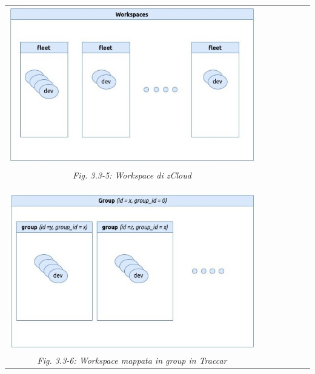 \documentclass[a4paper,titlepage,12pt]{book}
\begin{document}
{\begin{center}
\begin{tabular}{c c c cc c c}
\includegraphics[scale=0.6]{images/wks.jpg}\\ 
\textit{Fig. 3.3-5: Workspace di zCloud}\\
\\
\\
\\
\includegraphics[scale=0.6]{images/groups.jpg} \\
\textit{Fig. 3.3-6: Workspace mappata in group in Traccar}

\end{tabular}
\end{center}

}
\end{document}

